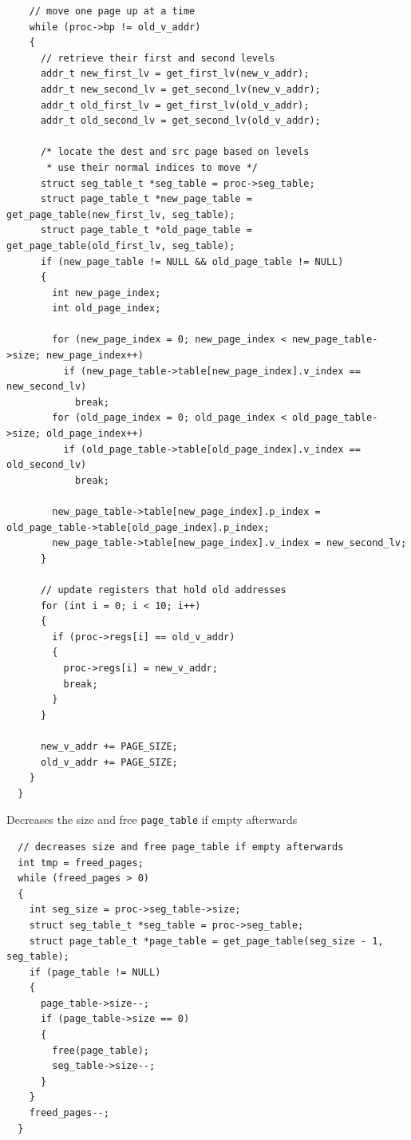 \documentclass[a4paper]{article}
\numberwithin{equation}{section}
\begin{document}
\begin{steps}
\begin{mdframed}[leftline=false,rightline=false,backgroundcolor=magenta!10,nobreak=false]
\begin{verbatim}
    // move one page up at a time
    while (proc->bp != old_v_addr)
    {
      // retrieve their first and second levels
      addr_t new_first_lv = get_first_lv(new_v_addr);
      addr_t new_second_lv = get_second_lv(new_v_addr);
      addr_t old_first_lv = get_first_lv(old_v_addr);
      addr_t old_second_lv = get_second_lv(old_v_addr);

      /* locate the dest and src page based on levels
       * use their normal indices to move */
      struct seg_table_t *seg_table = proc->seg_table;
      struct page_table_t *new_page_table = get_page_table(new_first_lv, seg_table);
      struct page_table_t *old_page_table = get_page_table(old_first_lv, seg_table);
      if (new_page_table != NULL && old_page_table != NULL)
      {
        int new_page_index;
        int old_page_index;

        for (new_page_index = 0; new_page_index < new_page_table->size; new_page_index++)
          if (new_page_table->table[new_page_index].v_index == new_second_lv)
            break;
        for (old_page_index = 0; old_page_index < old_page_table->size; old_page_index++)
          if (old_page_table->table[old_page_index].v_index == old_second_lv)
            break;

        new_page_table->table[new_page_index].p_index = old_page_table->table[old_page_index].p_index;
        new_page_table->table[new_page_index].v_index = new_second_lv;
      }

      // update registers that hold old addresses
      for (int i = 0; i < 10; i++)
      {
        if (proc->regs[i] == old_v_addr)
        {
          proc->regs[i] = new_v_addr;
          break;
        }
      }

      new_v_addr += PAGE_SIZE;
      old_v_addr += PAGE_SIZE;
    }
  }
    \end{verbatim}
  \end{mdframed}

  \item Decreases the size and free \texttt{page_table} if empty afterwards
  \begin{mdframed}[leftline=false,rightline=false,backgroundcolor=magenta!10,nobreak=false]
    \begin{verbatim}
  // decreases size and free page_table if empty afterwards
  int tmp = freed_pages;
  while (freed_pages > 0)
  {
    int seg_size = proc->seg_table->size;
    struct seg_table_t *seg_table = proc->seg_table;
    struct page_table_t *page_table = get_page_table(seg_size - 1, seg_table);
    if (page_table != NULL)
    {
      page_table->size--;
      if (page_table->size == 0)
      {
        free(page_table);
        seg_table->size--;
      }
    }
    freed_pages--;
  }
    \end{verbatim}
  \end{mdframed}


\end{steps}
\end{document}
